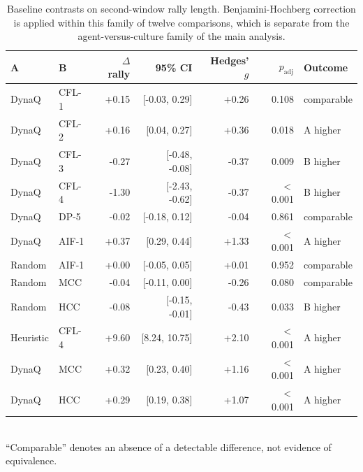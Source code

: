 \begin{table}[ht]
\centering
\small
\caption{Baseline contrasts on second-window rally length. Benjamini-Hochberg correction is applied within this family of twelve comparisons, which is separate from the agent-versus-culture family of the main analysis.}
\label{tab:baseline-contrasts}
\begin{tabular}{llrrrrl}
\toprule
A & B & $\Delta$ rally & 95\% CI & Hedges' $g$ & $p_{\mathrm{adj}}$ & Outcome \\
\midrule
DynaQ & CFL-1 & +0.15 & [-0.03, 0.29] & +0.26 & 0.108 & comparable \\
DynaQ & CFL-2 & +0.16 & [0.04, 0.27] & +0.36 & 0.018 & A higher \\
DynaQ & CFL-3 & -0.27 & [-0.48, -0.08] & -0.37 & 0.009 & B higher \\
DynaQ & CFL-4 & -1.30 & [-2.43, -0.62] & -0.37 & $<$0.001 & B higher \\
DynaQ & DP-5 & -0.02 & [-0.18, 0.12] & -0.04 & 0.861 & comparable \\
DynaQ & AIF-1 & +0.37 & [0.29, 0.44] & +1.33 & $<$0.001 & A higher \\
Random & AIF-1 & +0.00 & [-0.05, 0.05] & +0.01 & 0.952 & comparable \\
Random & MCC & -0.04 & [-0.11, 0.00] & -0.26 & 0.080 & comparable \\
Random & HCC & -0.08 & [-0.15, -0.01] & -0.43 & 0.033 & B higher \\
Heuristic & CFL-4 & +9.60 & [8.24, 10.75] & +2.10 & $<$0.001 & A higher \\
DynaQ & MCC & +0.32 & [0.23, 0.40] & +1.16 & $<$0.001 & A higher \\
DynaQ & HCC & +0.29 & [0.19, 0.38] & +1.07 & $<$0.001 & A higher \\
\bottomrule
\end{tabular}
\\[4pt]\footnotesize{``Comparable'' denotes an absence of a detectable difference, not evidence of equivalence.}
\end{table}
